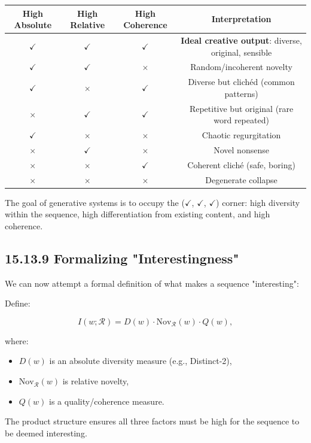 \begin{center}
\begin{tabular}{cccc}
\toprule
High Absolute & High Relative & High Coherence & Interpretation \\
\midrule
$\checkmark$ & $\checkmark$ & $\checkmark$ & \textbf{Ideal creative output}: diverse, original, sensible \\
$\checkmark$ & $\checkmark$ & $\times$ & Random/incoherent novelty \\
$\checkmark$ & $\times$ & $\checkmark$ & Diverse but clichéd (common patterns) \\
$\times$ & $\checkmark$ & $\checkmark$ & Repetitive but original (rare word repeated) \\
$\checkmark$ & $\times$ & $\times$ & Chaotic regurgitation \\
$\times$ & $\checkmark$ & $\times$ & Novel nonsense \\
$\times$ & $\times$ & $\checkmark$ & Coherent cliché (safe, boring) \\
$\times$ & $\times$ & $\times$ & Degenerate collapse \\
\bottomrule
\end{tabular}
\end{center}

The goal of generative systems is to occupy the ($\checkmark$, $\checkmark$, $\checkmark$) corner: high diversity within the sequence, high differentiation from existing content, and high coherence.

\subsection{15.13.9 Formalizing "Interestingness"}

We can now attempt a formal definition of what makes a sequence "interesting":

\begin{definition}
Define:

\[I(w; \mathcal{R}) = D(w) \cdot \mathrm{Nov}_{\mathcal{R}}(w) \cdot Q(w),\]

where:
\begin{itemize}
\item $D(w)$ is an absolute diversity measure (e.g., Distinct-2),
\item $\mathrm{Nov}_{\mathcal{R}}(w)$ is relative novelty,
\item $Q(w)$ is a quality/coherence measure.

\end{itemize}
The product structure ensures all three factors must be high for the sequence to be deemed interesting.
\end{definition}

